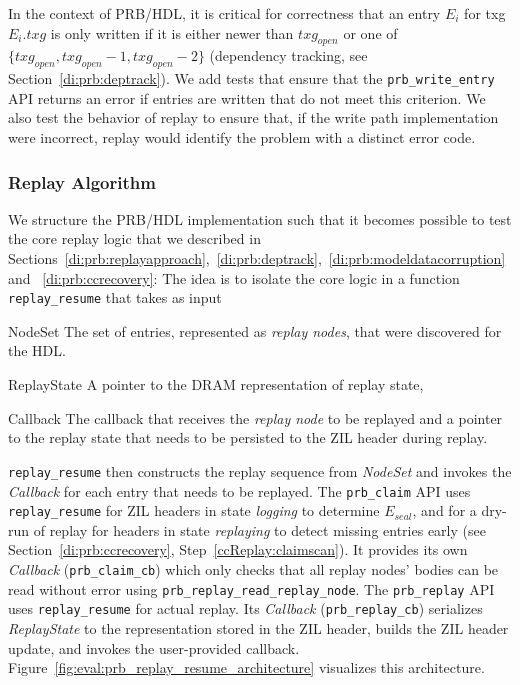 \documentclass[12pt,a4paper,twoside]{book}
\begin{document}
In the context of PRB/HDL, it is critical for correctness that an entry $E_i$ for txg $E_i.txg$ is only written if it is either newer than $txg_{open}$ or one of $\{txg_{open}, txg_{open}-1, txg_{open}-2\}$ (dependency tracking, see Section~\ref{di:prb:deptrack}).
We add tests that ensure that the \lstinline{prb_write_entry} API returns an error if entries are written that do not meet this criterion.
We also test the behavior of replay to ensure that, if the write path implementation were incorrect, replay would identify the problem with a distinct error code.

\subsubsection{Replay Algorithm}
We structure the PRB/HDL implementation such that it becomes possible to test the core replay logic that we described in Sections~\ref{di:prb:replayapproach},~\ref{di:prb:deptrack},~\ref{di:prb:modeldatacorruption} and ~\ref{di:prb:ccrecovery}:
The idea is to isolate the core logic in a function \lstinline{replay_resume} that takes as input
\begin{description}[noitemsep,leftmargin=1.5cm,labelindent=1cm]
    \item[NodeSet] The set of entries, represented as \textit{replay nodes}, that were discovered for the HDL.
    \item[ReplayState] A pointer to the DRAM representation of replay state,
    \item[Callback] The callback that receives the \textit{replay node} to be replayed and a pointer to the replay state that needs to be persisted to the ZIL header during replay.
\end{description}
\lstinline{replay_resume} then constructs the replay sequence from \textit{NodeSet} and invokes the \textit{Callback} for each entry that needs to be replayed.
The \lstinline{prb_claim} API uses \lstinline{replay_resume} for ZIL headers in state \textit{logging} to determine $E_{seal}$, and for a dry-run of replay for headers in state \textit{replaying} to detect missing entries early (see Section~\ref{di:prb:ccrecovery}, Step~\ref{ccReplay:claimscan}).
It provides its own \textit{Callback} (\lstinline{prb_claim_cb}) which only checks that all replay nodes' bodies can be read without error using \lstinline{prb_replay_read_replay_node}.
The \lstinline{prb_replay} API uses \lstinline{replay_resume} for actual replay.
Its \textit{Callback} (\lstinline{prb_replay_cb}) serializes \textit{ReplayState} to the representation stored in the ZIL header, builds the ZIL header update, and invokes the user-provided callback.
Figure~\ref{fig:eval:prb_replay_resume_architecture} visualizes this architecture.
\end{document}
